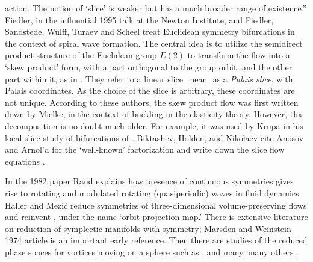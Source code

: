 {{action. The notion of `slice' is weaker but has a much
broader range of existence.''
}
Fiedler, in the influential 1995 talk
at the Newton Institute, and Fiedler, Sandstede, Wulff,
Turaev and  Scheel
treat Euclidean symmetry bifurcations in the context of
spiral wave formation. The central idea is to utilize the
semidirect product structure of the Euclidean group $E(2)$ to
transform the flow into a `skew product' form, with a part
orthogonal to the group orbit, and the other part within it,
as in . They refer to a linear slice
\pSRed\ near \reqv\ as a {\em Palais slice}, with Palais
coordinates. As the choice of the slice is arbitrary, these
coordinates are not unique. According to these authors, the
skew product flow was first written down by
Mielke, in the context of buckling in the
elasticity theory. However, this decomposition is no doubt
much older. For example, it was  used by
Krupa in his local slice study of
bifurcations of \reqva. Biktashev, Holden, and
Nikolaev cite Anosov and Arnol'd  for
the `well-known' factorization  and write
down the slice flow equations .

In the 1982 paper Rand explains how
presence of continuous symmetries gives rise to rotating and
modulated rotating (quasiperiodic) waves in fluid dynamics.
Haller and Mezi\'c reduce symmetries of
three-dimensional volume-preserving flows and reinvent
\mframes, under the name `orbit projection map.' There is
extensive literature on reduction of symplectic manifolds
with symmetry; Marsden and Weinstein 1974 article
is an important early reference. Then there are studies of
the reduced phase spaces for vortices moving on a sphere such
as , and many, many others
    .

}
